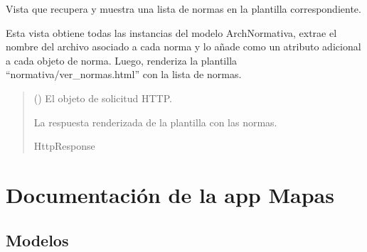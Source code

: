\documentclass[letterpaper,10pt,spanish]{sphinxmanual}
\begin{document}
\begin{fulllineitems}

\pysigstartsignatures
{}
\pysigstopsignatures
\sphinxAtStartPar
Vista que recupera y muestra una lista de normas en la plantilla correspondiente.

\sphinxAtStartPar
Esta vista obtiene todas las instancias del modelo ArchNormativa, extrae el nombre del archivo
asociado a cada norma y lo añade como un atributo adicional a cada objeto de norma.
Luego, renderiza la plantilla “normativa/ver\_normas.html” con la lista de normas.
\begin{quote}\begin{description}
\sphinxAtStartPar
{} () \textendash{} El objeto de solicitud HTTP.

\sphinxAtStartPar
La respuesta renderizada de la plantilla con las normas.

\sphinxAtStartPar
HttpResponse

\end{description}\end{quote}

\end{fulllineitems}


\sphinxstepscope


\chapter{Documentación de la app Mapas}
\label{\detokenize{oplectura:documentacion-de-la-app-mapas}}\label{\detokenize{oplectura::doc}}

\section{Modelos}
\label{\detokenize{oplectura:modelos}}
\end{document}
